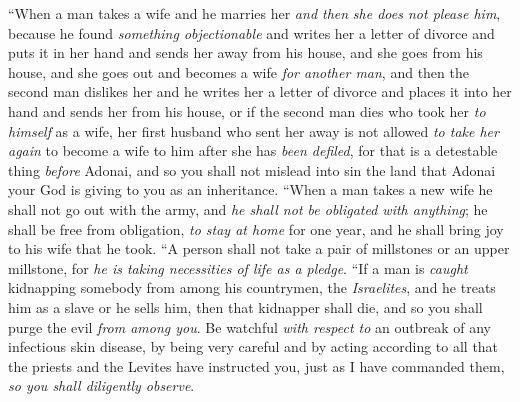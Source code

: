 \begin{biblechapter} %
\verse “When a man takes a wife and he marries her \textit{and then} \textit{she does not please him}, because he found \textit{something objectionable} and writes her a letter of divorce and puts it in her hand and sends her away from his house,
\verse and she goes from his house, and she goes out and becomes a wife \textit{for another man},
\verse and then the second man dislikes her and he writes her a letter of divorce and places it into her hand and sends her from his house, or if the second man dies who took her \textit{to himself} as a wife,
\verse her first husband who sent her away is not allowed \textit{to take her again} to become a wife to him after she has \textit{been defiled}, for that is a detestable thing \textit{before} Adonai, and so you shall not mislead into sin the land that Adonai your God is giving to you as an inheritance.
\verse “When a man takes a new wife he shall not go out with the army, and \textit{he shall not be obligated with anything}; he shall be free from obligation, \textit{to stay at home} for one year, and he shall bring joy to his wife that he took.
\verse “A person shall not take a pair of millstones or an upper millstone, for \textit{he is taking necessities of life as a pledge}.
\verse “If a man is \textit{caught} kidnapping somebody from among his countrymen, the \textit{Israelites}, and he treats him as a slave or he sells him, then that kidnapper shall die, and so you shall purge the evil \textit{from among you}.
\verse Be watchful \textit{with respect to} an outbreak of any infectious skin disease, by being very careful and by acting according to all that the priests and the Levites have instructed you, just as I have commanded them, \textit{so you shall diligently observe}.

\end{biblechapter}

